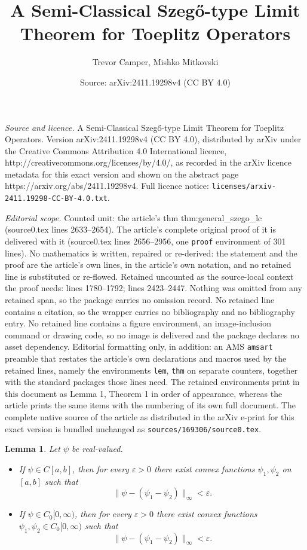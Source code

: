 \documentclass[10pt,a4paper]{amsart}
\title{A Semi-Classical Szeg\H{o}-type Limit Theorem for Toeplitz Operators}
\author{Trevor Camper, Mishko Mitkovski}
\date{Source: arXiv:2411.19298v4 (CC BY 4.0)}
\newtheorem{lem}{Lemma}
\begin{document}
\maketitle

\noindent\emph{Source and licence.} A Semi-Classical Szeg\H{o}-type Limit Theorem for Toeplitz Operators. Version arXiv:2411.19298v4 (CC BY 4.0), distributed by arXiv under the Creative Commons Attribution 4.0 International licence, http://creativecommons.org/licenses/by/4.0/, as recorded in the arXiv licence metadata for this exact version and shown on the abstract page https://arxiv.org/abs/2411.19298v4. Full licence notice: \texttt{licenses/arxiv-2411.19298-CC-BY-4.0.txt}.\par\smallskip

\noindent\textit{Editorial scope.} Counted unit: the article's thm thm:general\_szego\_lc (source0.tex lines 2633--2654). The article's complete original proof of it is delivered with it (source0.tex lines 2656--2956, one \texttt{proof} environment of 301 lines). No mathematics is written, repaired or re-derived: the statement and the proof are the article's own lines, in the article's own notation, and no retained line is substituted or re-flowed.  Retained uncounted as the source-local context the proof needs: lines 1780--1792; lines 2423--2447.  Nothing was omitted from any retained span, so the package carries no omission record.  No retained line contains a citation, so the wrapper carries no bibliography and no bibliography entry.  No retained line contains a figure environment, an image-inclusion command or drawing code, so no image is delivered and the package declares no asset dependency.  Editorial formatting only, in addition: an AMS \texttt{amsart} preamble that restates the article's own declarations and macros used by the retained lines, namely the environments \texttt{lem}, \texttt{thm} on separate counters, together with the standard packages those lines need.  The retained environments print in this document as Lemma 1, Theorem 1 in order of appearance, whereas the article prints the same items with the numbering of its own full document.  The complete native source of the article as distributed in the arXiv e-print for this exact version is bundled unchanged as \texttt{sources/169306/source0.tex}.
\begin{lem}\label{lem:diff_convex}
Let $\psi$ be real-valued. 
\begin{itemize}
    \item[(i)] If $\psi\in C[a,b]$, then for every $\varepsilon>0$ there exist convex functions $\psi_1,\psi_2$ on $[a,b]$ such that 
    \[
        \|\psi-(\psi_1-\psi_2)\|_{\infty} < \varepsilon.
    \]
    \item[(ii)] If $\psi\in C_0[0,\infty)$, then for every $\varepsilon>0$ there exist convex functions $\psi_1,\psi_2\in C_0[0,\infty)$ such that
    \[
        \|\psi-(\psi_1-\psi_2)\|_\infty < \varepsilon.
    \]
\end{itemize}
\end{lem}
\end{document}
